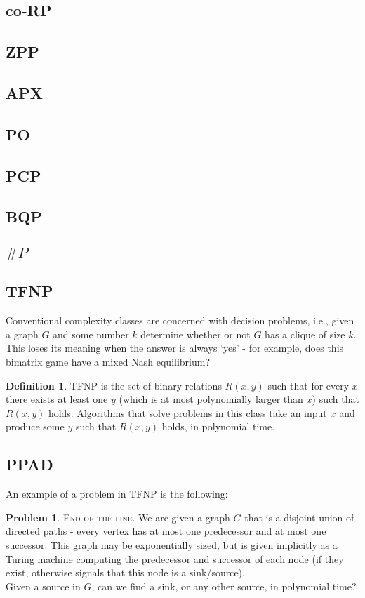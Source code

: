 \documentclass[]{article}
\theoremstyle{definition}
\newtheorem{definition}{Definition}[section]
\newtheorem{problem}{Problem}[section]
\begin{document}
\subsection{co-RP}

\subsection{ZPP}

\subsection{APX}

\subsection{PO}

\subsection{PCP}

\subsection{BQP}

\subsection{$\# P$}
\fi
\subsection{TFNP}
Conventional complexity classes are concerned with decision problems, i.e., given a graph $G$ and some number $k$ determine whether or not $G$ has a clique of size $k$.\\
This loses its meaning when the answer is always `yes' - for example, does this bimatrix game have a mixed Nash equilibrium?\\
\begin{definition}
	TFNP is the set of binary relations $R(x, y)$ such that for every $x$ there exists at least one $y$ (which is at most polynomially larger than $x$) such that $R(x,y)$ holds.
	Algorithms that solve problems in this class take an input $x$ and produce some $y$ such that $R(x, y)$ holds, in polynomial time.
\end{definition}

\subsection{PPAD}
An example of a problem in TFNP is the following:
\begin{problem}
	\textsc{End of the line.} We are given a graph $G$ that is a disjoint union of directed paths - every vertex has at most one predecessor and at most one successor. This graph may be exponentially sized,
	but is given implicitly as a Turing machine computing the predecessor and successor of each node (if they exist, otherwise signals that this node is a sink/source).\\
	Given a source in $G$, can we find a sink, or any other source, in polynomial time?
\end{problem}
\end{document}
